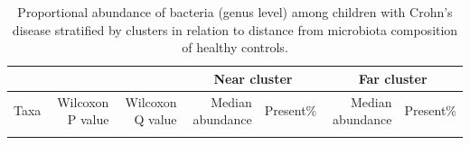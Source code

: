 \newpage
{\footnotesize
	\renewcommand{\arraystretch}{0.7} \setlength{\tabcolsep}{3pt}
	\begin{longtable}{ | l | r | r | r | r | r | r  | }
		\caption[Proportional abundance of bacteria (genus level) among children with Crohn’s disease stratified by clusters in relation to distance from microbiota composition of healthy controls.]{Proportional abundance of bacteria (genus level) among children with Crohn’s disease stratified by clusters in relation to distance from microbiota composition of healthy controls.} 
		\label{TS3} \\
		
		\hline
		\multicolumn{3}{|c|}{} & \multicolumn{2}{c}{Near cluster}
		& \multicolumn{2}{|c|}{Far cluster}\\
		\hline 
		Taxa & Wilcoxon P value & Wilcoxon Q value & Median abundance & Present\% & Median abundance & Present\% \\ 
		\hline 
		\endfirsthead
		
		
		\endfoot
		
		\hline 
		\endlastfoot
		
		
		

\end{longtable}}
